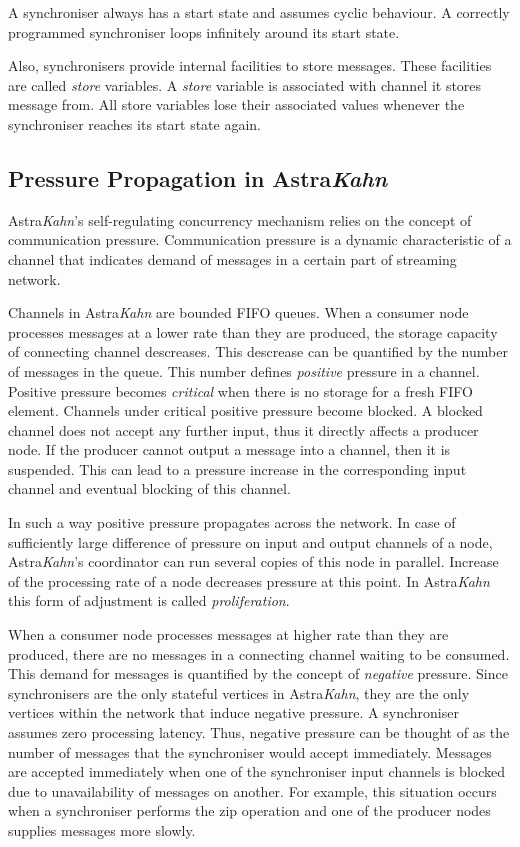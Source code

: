 \documentclass{article}
\begin{document}
A synchroniser always has a start state and assumes cyclic behaviour. A correctly programmed synchroniser loops infinitely around its start state. 

Also, synchronisers provide internal facilities to store messages. These facilities are called \emph{store} variables. A \emph{store} variable is associated with channel it stores message from. All store variables lose their associated values whenever the synchroniser reaches its start state again.

\subsection{Pressure Propagation in Astra\emph{Kahn}}
Astra\emph{Kahn}'s self-regulating concurrency mechanism relies on the concept of communication pressure. Communication pressure is a dynamic characteristic of a channel that indicates demand of messages in a certain part of streaming network. 

Channels in Astra\emph{Kahn} are bounded FIFO queues. When a consumer node processes messages at a lower rate than they are produced, the storage capacity of connecting channel descreases. This descrease can be quantified by the number of messages in the queue. This number defines \emph{positive} pressure in a channel. Positive pressure becomes \emph{critical} when there is no storage for a fresh FIFO element. Channels under critical positive pressure become blocked. A blocked channel does not accept any further input, thus it directly affects a producer node. If the producer cannot output a message into a channel, then it is suspended. This can lead to a pressure increase in the corresponding input channel and eventual blocking of this channel.

In such a way positive pressure propagates across the network. In case of sufficiently large difference of pressure on input and output channels of a node, Astra\emph{Kahn}'s coordinator can run several copies of this node in parallel. Increase of the processing rate of a node decreases pressure at this point. In Astra\emph{Kahn} this form of adjustment is called \emph{proliferation}.

When a consumer node processes messages at higher rate than they are produced, there are no messages in a connecting channel waiting to be consumed. This demand for messages is quantified by the concept of \emph{negative} pressure. Since synchronisers are the only stateful vertices in Astra\emph{Kahn}, they are the only vertices within the network that induce negative pressure. A synchroniser assumes zero processing latency. Thus, negative pressure can be thought of as the number of messages that the synchroniser would accept immediately. Messages are accepted immediately when one of the synchroniser input channels is blocked due to unavailability of messages on another. For example, this situation occurs when a synchroniser performs the zip operation and one of the producer nodes supplies messages more slowly.
\end{document}
